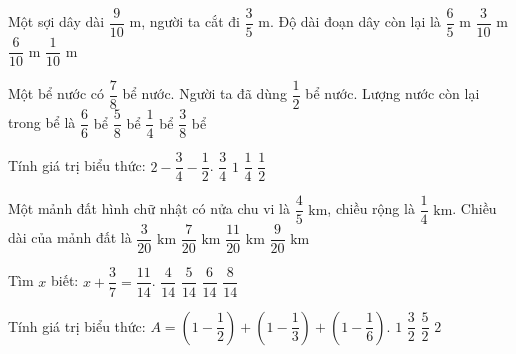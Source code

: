 \begin{ex} %
Một sợi dây dài $\dfrac{9}{10}\text{ m}$, người ta cắt đi $\dfrac{3}{5}\text{ m}$. Độ dài đoạn dây còn lại là
\choice
{$\dfrac{6}{5}\text{ m}$}
{\True $\dfrac{3}{10}\text{ m}$}
{$\dfrac{6}{10}\text{ m}$}
{$\dfrac{1}{10}\text{ m}$}
\end{ex}

\begin{ex} %
Một bể nước có $\dfrac{7}{8}$ bể nước. Người ta đã dùng $\dfrac{1}{2}$ bể nước. Lượng nước còn lại trong bể là
\choice
{$\dfrac{6}{6}$ bể}
{$\dfrac{5}{8}$ bể}
{$\dfrac{1}{4}$ bể}
{\True $\dfrac{3}{8}$ bể}
\end{ex}

\begin{ex} %
Tính giá trị biểu thức: $2 - \dfrac{3}{4} - \dfrac{1}{2}$.
\choice
{\True $\dfrac{3}{4}$}
{$1$}
{$\dfrac{1}{4}$}
{$\dfrac{1}{2}$}
\end{ex}

\begin{ex} %
Một mảnh đất hình chữ nhật có nửa chu vi là $\dfrac{4}{5}\text{ km}$, chiều rộng là $\dfrac{1}{4}\text{ km}$. Chiều dài của mảnh đất là
\choice
{$\dfrac{3}{20}\text{ km}$}
{$\dfrac{7}{20}\text{ km}$}
{\True $\dfrac{11}{20}\text{ km}$}
{$\dfrac{9}{20}\text{ km}$}
\end{ex}

\begin{ex} %
Tìm $x$ biết: $x + \dfrac{3}{7} = \dfrac{11}{14}$.
\choice
{$\dfrac{4}{14}$}
{\True $\dfrac{5}{14}$}
{$\dfrac{6}{14}$}
{$\dfrac{8}{14}$}
\end{ex}

\begin{ex} %
Tính giá trị biểu thức: $A = \left(1 - \dfrac{1}{2}\right) + \left(1 - \dfrac{1}{3}\right) + \left(1 - \dfrac{1}{6}\right)$.
\choice
{$1$}
{$\dfrac{3}{2}$}
{$\dfrac{5}{2}$}
{\True $2$}
\end{ex}

